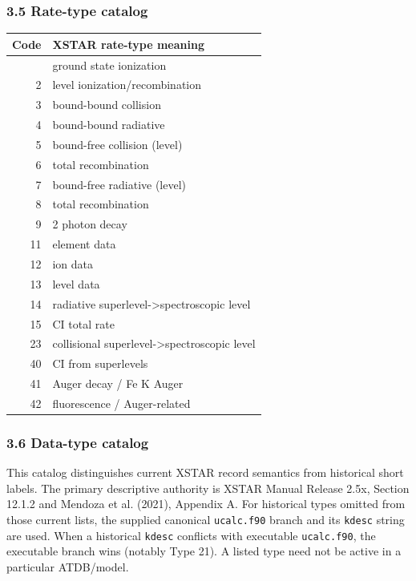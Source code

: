 \documentclass[
  10pt,
]{article}
\begin{document}
\subsubsection{3.5 Rate-type catalog}\label{rate-type-catalog}

\begin{longtable}[]{@{}rl@{}}
\toprule\noalign{}
Code & XSTAR rate-type meaning \\
\midrule\noalign{}
\endhead
\bottomrule\noalign{}
\endlastfoot
1 & ground state ionization \\
2 & level ionization/recombination \\
3 & bound-bound collision \\
4 & bound-bound radiative \\
5 & bound-free collision (level) \\
6 & total recombination \\
7 & bound-free radiative (level) \\
8 & total recombination \\
9 & 2 photon decay \\
11 & element data \\
12 & ion data \\
13 & level data \\
14 & radiative superlevel-\textgreater spectroscopic level \\
15 & CI total rate \\
23 & collisional superlevel-\textgreater spectroscopic level \\
40 & CI from superlevels \\
41 & Auger decay / Fe K Auger \\
42 & fluorescence / Auger-related \\
\end{longtable}

\subsubsection{3.6 Data-type catalog}\label{data-type-catalog}

This catalog distinguishes current XSTAR record semantics from historical short labels. The primary descriptive authority is XSTAR Manual Release 2.5x, Section 12.1.2 and Mendoza et al. (2021), Appendix A. For historical types omitted from those current lists, the supplied canonical \texttt{ucalc.f90} branch and its \texttt{kdesc} string are used. When a historical \texttt{kdesc} conflicts with executable \texttt{ucalc.f90}, the executable branch wins (notably Type 21). A listed type need not be active in a particular ATDB/model.
\end{document}
